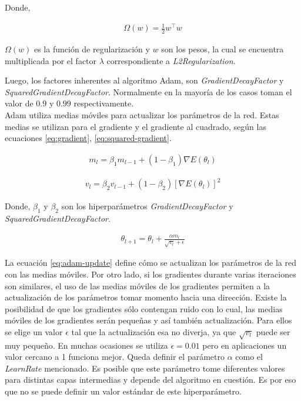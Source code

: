 Donde,

\begin{align}
  \Omega(w) = \frac{1}{2} w^\top w
\end{align}

\indent $\Omega(w)$ es la función de regularización y $w$ son los pesos, la cual se encuentra multiplicada por el
factor $\lambda$ correspondiente a \textit{L2Regularization}. \bigskip

\indent Luego, los factores inherentes al algoritmo Adam, son \textit{GradientDecayFactor} y
\textit{SquaredGradientDecayFactor}. Normalmente en la mayoría de los casos toman el valor de $0.9$ y $0.99$
respectivamente. \\
\indent Adam utiliza medias móviles para actualizar los parámetros de la red. Estas medias se utilizan para el
gradiente y el gradiente al cuadrado, según las ecuaciones \ref{eq:gradient}, \ref{eq:squared-gradient}.

\begin{align} \label{eq:gradient}
  m_l = \beta_1 m_{l-1} + (1-\beta_1) \nabla E(\theta_l)
\end{align}

\begin{align} \label{eq:squared-gradient}
  v_l = \beta_2 v_{l-1} + (1-\beta_2) [\nabla E(\theta_l)]^2
\end{align}

Donde, $\beta_1$ y $\beta_2$ son los hiperparámetros \textit{GradientDecayFactor} y \textit{SquaredGradientDecayFactor}.

\begin{align} \label{eq:adam-update}
  \theta_{l+1} = \theta_l + \frac{\alpha m_l}{\sqrt{v_l}+\epsilon}
\end{align}

\indent La ecuación \ref{eq:adam-update} define cómo se actualizan los parámetros de la red con las medias móviles.
Por otro lado, si los gradientes durante varias iteraciones son similares, el uso de las medias móviles de los
gradientes permiten a la actualización de los parámetros tomar momento hacia una dirección. Existe la posibilidad de
que los gradientes sólo contengan ruido con lo cual, las medias móviles de los gradientes serán pequeñas y así
también actualización. Para ellos se elige un valor $\epsilon$ tal que la actualización esa no diverja, ya que
$\sqrt{v_l}$ puede ser muy pequeño. En muchas ocasiones se utiliza $\epsilon = 0.01$ pero en aplicaciones un valor
cercano a 1 funciona mejor. Queda definir el parámetro $\alpha$ como el \textit{LearnRate} mencionado. Es posible
que este parámetro tome diferentes valores para distintas capas intermedias y depende del algoritmo en cuestión. Es
por eso que no se puede definir un valor estándar de este hiperparámetro. \bigskip

